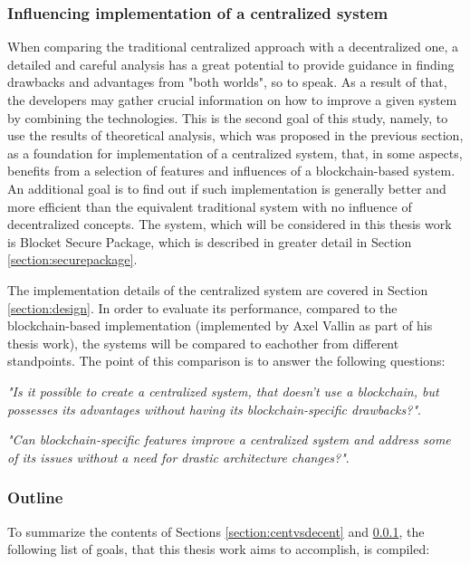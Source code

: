 \subsubsection{Influencing implementation of a centralized system} \label{section:hybridversion}
When comparing the traditional centralized approach with a decentralized one, a detailed and careful analysis has a great potential to provide guidance in finding drawbacks and advantages from "both worlds", so to speak. As a result of that, the developers may gather crucial information on how to improve a given system by combining the technologies. This is the second goal of this study, namely, to use the results of theoretical analysis, which was proposed in the previous section, as a foundation for implementation of a centralized system, that, in some aspects, benefits from a selection of features and influences of a blockchain-based system. An additional goal is to find out if such implementation is generally better and more efficient than the equivalent traditional system with no influence of decentralized concepts. The system, which will be considered in this thesis work is Blocket Secure Package, which is described in greater detail in Section \ref{section:securepackage}.

The implementation details of the centralized system are covered in Section \ref{section:design}. In order to evaluate its performance, compared to the blockchain-based implementation (implemented by Axel Vallin as part of his thesis work), the systems will be compared to eachother from different standpoints. The point of this comparison is to answer the following questions: 

\begin{displayquote}
\textit{"Is it possible to create a centralized system, that doesn't use a blockchain, but possesses its advantages without having its blockchain-specific drawbacks?"}.
\end{displayquote} 

\begin{displayquote}
\textit{"Can blockchain-specific features improve a centralized system and address some of its issues without a need for drastic architecture changes?"}.
\end{displayquote} 

\subsubsection{Outline}
To summarize the contents of Sections \ref{section:centvsdecent} and \ref{section:hybridversion}, the following list of goals, that this thesis work aims to accomplish, is compiled:

